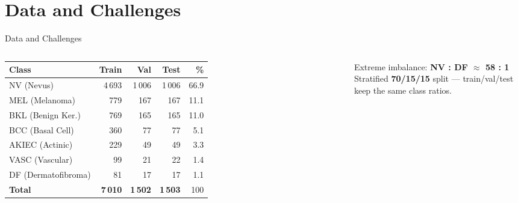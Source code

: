 \documentclass[10pt, aspectratio=169]{beamer}
\renewcommand{\framesubtitle}[1]{%
  \vspace*{-0.3em}\noindent{\large\bfseries\textcolor{usthdark}{#1}}\par\vspace{0.6em}%
}
\begin{document}
\section{Data and Challenges}
\begin{frame}{Data and Challenges}
    \framesubtitle{ISIC 2018 Task 3 (HAM10000) --- 10,015 dermoscopy images, 7 classes}
    \begin{columns}[T]
        \scriptsize
        \begin{table}[]
            \centering
            \begin{tabular}{lrrrr}
            \toprule
            \rowcolor{usthblue!25} \textbf{Class} & \textbf{Train} & \textbf{Val} & \textbf{Test} & \textbf{\%} \\
            \midrule
            NV (Nevus)          & 4\,693 & 1\,006 & 1\,006 & 66.9 \\
            MEL (Melanoma)      &   779  &  167   &  167   & 11.1 \\
            BKL (Benign Ker.)   &   769  &  165   &  165   & 11.0 \\
            BCC (Basal Cell)    &   360  &   77   &   77   &  5.1 \\
            AKIEC (Actinic)     &   229  &   49   &   49   &  3.3 \\
            VASC (Vascular)     &    99  &   21   &   22   &  1.4 \\
            DF (Dermatofibroma) &    81  &   17   &   17   &  1.1 \\
            \midrule
            \textbf{Total}      & \textbf{7\,010} & \textbf{1\,502} & \textbf{1\,503} & 100 \\
            \bottomrule
            \end{tabular}
        \end{table}
        \vspace{0.1cm}
        \centering
        \textcolor{usthred}{\footnotesize Extreme imbalance: \textbf{NV : DF $\approx$ 58 : 1}} \\[3pt]
        \footnotesize Stratified \textbf{70/15/15} split --- train/val/test keep the same class ratios.


\end{columns}
\end{frame}
\end{document}
